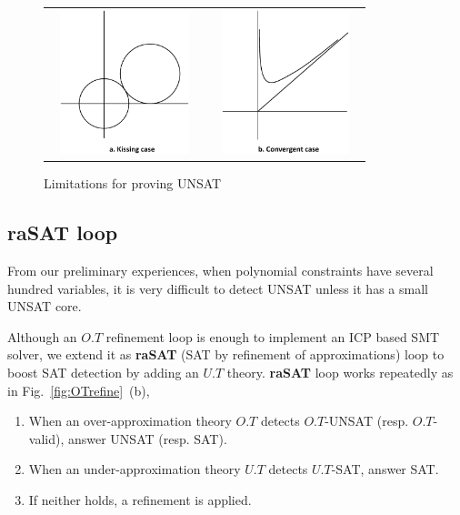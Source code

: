 \documentclass[runningheads,a4paper,oribibl]{llncs}
\begin{document}
\begin{figure}[ht]
\centering
\begin{tabular}{cc}
\includegraphics[height=1.65in,width=1.7in]{kissing.eps} &
\includegraphics[height=1.65in,width=1.7in]{convergence.eps}
\end{tabular}
\caption{Limitations for proving UNSAT} 
\label{fig:limit} 
\end{figure} 



\subsection{raSAT loop}

From our preliminary experiences, 
when polynomial constraints have several hundred variables, 
it is very difficult to detect UNSAT unless it has a small UNSAT core. 

Although an $O.T$ refinement loop is enough to implement an ICP based SMT solver, 
we extend it as {\bf raSAT} (SAT by refinement of approximations) loop to boost SAT detection 
by adding an $U.T$ theory. 
{\bf raSAT} loop works repeatedly as in Fig.~\ref{fig:OTrefine}~(b), 
\begin{enumerate}
\item When an over-approximation theory $O.T$ detects $O.T$-UNSAT (resp. $O.T$-valid), 
answer UNSAT (resp. SAT). 
\item When an under-approximation theory $U.T$ detects $U.T$-SAT, answer SAT. 
\item If neither holds, a refinement is applied. 
\end{enumerate}
\end{document}
